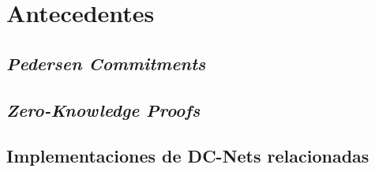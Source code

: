 \chapter{Antecedentes}
\section{\emph{Pedersen Commitments}}
\section{\emph{Zero-Knowledge Proofs}}
\section{Implementaciones de DC-Nets relacionadas}